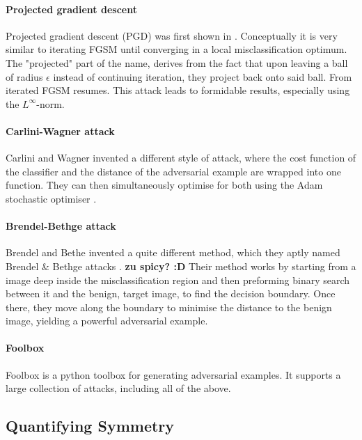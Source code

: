 \documentclass{article}
\begin{document}
\paragraph{Projected gradient descent}
Projected gradient descent (PGD) was first shown in \cite{madry2017towards}. Conceptually it is very similar to iterating FGSM until converging in a local misclassification optimum. The "projected" part of the name, derives from the fact that upon leaving a ball of radius $\epsilon$ instead of continuing iteration, they project back onto said ball. From iterated FGSM resumes.
This attack leads to formidable results, especially using the $L^\infty$-norm.



\paragraph{Carlini-Wagner attack}

Carlini and Wagner \cite{carlini2017towards} invented a different style of attack, where the cost function of the classifier and the distance of the adversarial example are wrapped into one function. They can then simultaneously optimise for both using the Adam stochastic optimiser \cite{kingma2017adam}.

\paragraph{Brendel-Bethge attack}

Brendel and Bethe invented a quite different method, which they aptly named Brendel \& Bethge attacks \cite{brendel2019accurate}. \textbf{zu spicy? :D}
Their method works by starting from a image deep inside the misclassification region and then preforming binary search between it and the benign, target image, to find the decision boundary. Once there, they move along the boundary to minimise the distance to the benign image, yielding a powerful adversarial example.

\paragraph{Foolbox}
Foolbox is a python toolbox for generating adversarial examples\cite{rauber2017foolbox}. It supports a large collection of attacks, including all of the above.

\subsection{Quantifying Symmetry}
\end{document}
